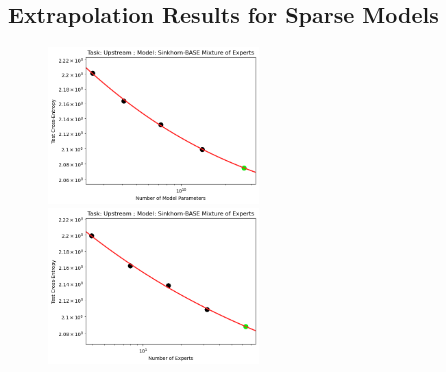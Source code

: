 \documentclass{article} %
\begin{document}
\subsection{Extrapolation Results for Sparse Models}
\label{section:sparse}

\vspace{-4.0mm}

\begin{figure}[htbp]
    \centering
\includegraphics[width=0.497\textwidth]{figures/sparse/moe_sbase__params.png}
\includegraphics[width=0.497\textwidth]{figures/sparse/moe_sbase__experts.png}


\end{figure}
\end{document}
